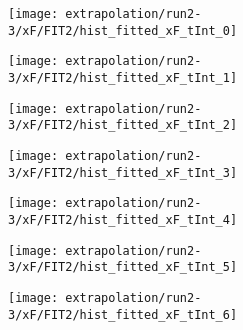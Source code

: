 \begin{figure}
\centering
\caption{Fit to the flask subtracted yield ratio with FIT2 for $x_F$ for run 2-3.}
\label{fig:run2-3_FIT2_xF}
\begin{subfigure}{0.45\linewidth}
\texttt{[image: extrapolation/run2-3/xF/FIT2/hist\_fitted\_xF\_tInt\_0]}
\end{subfigure}
\begin{subfigure}{0.45\linewidth}
\texttt{[image: extrapolation/run2-3/xF/FIT2/hist\_fitted\_xF\_tInt\_1]}
\end{subfigure}
\begin{subfigure}{0.45\linewidth}
\texttt{[image: extrapolation/run2-3/xF/FIT2/hist\_fitted\_xF\_tInt\_2]}
\end{subfigure}
\begin{subfigure}{0.45\linewidth}
\texttt{[image: extrapolation/run2-3/xF/FIT2/hist\_fitted\_xF\_tInt\_3]}
\end{subfigure}
\begin{subfigure}{0.45\linewidth}
\texttt{[image: extrapolation/run2-3/xF/FIT2/hist\_fitted\_xF\_tInt\_4]}
\end{subfigure}
\begin{subfigure}{0.45\linewidth}
\texttt{[image: extrapolation/run2-3/xF/FIT2/hist\_fitted\_xF\_tInt\_5]}
\end{subfigure}
\begin{subfigure}{0.45\linewidth}
\texttt{[image: extrapolation/run2-3/xF/FIT2/hist\_fitted\_xF\_tInt\_6]}
\end{subfigure}
\end{figure}
